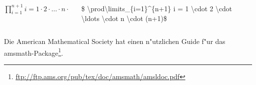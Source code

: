 \begin{frame}
\begin{columns}
\begin{column}{.4\textwidth}
\flushright
$\prod\limits_{i=1}^{n+1}i = 1 \cdot 2 \cdot \ldots \cdot n \cdot (n+1)$
\end{column}
\begin{column}{.6\textwidth}
\flushleft
{\ttfamily \color{unibayellowI}\$%
\color{nounibaredI}\textbackslash\color{nounibaredI}prod\textbackslash  limits\_\color{black}\{i=1\}\color{nounibaredI}\^{}\color{black}\{n+1\} i = 1 \color{nounibaredI}\textbackslash \color{nounibaredI}cdot \color{black}2 \color{nounibaredI}\textbackslash \color{nounibaredI}cdot \color{nounibaredI}\textbackslash \color{nounibaredI}ldots \color{nounibaredI}\textbackslash\color{nounibaredI}cdot \color{black}n \color{nounibaredI}\textbackslash \color{nounibaredI}cdot \color{black}(n+1)\color{unibayellowI}\$}
\end{column}
\end{columns}
\bigskip
Die  American Mathematical Society hat einen n"utzlichen Guide f"ur das {\ttfamily amsmath}-Package\footnote{\url{ftp://ftp.ams.org/pub/tex/doc/amsmath/amsldoc.pdf}}.
\end{frame}

